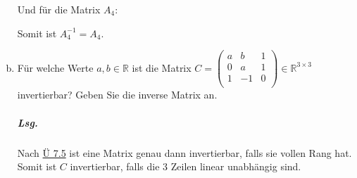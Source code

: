 \documentclass{scrreprt}
\begin{document}
\begin{enumerate}[(a)]
  Und für die Matrix $A_4$:
  Somit ist $A_4^{-1} = A_4$.

\newpage
\item Für welche Werte $a, b \in \mathbb{R}$ ist die Matrix $C = \begin{pmatrix}
  a & b  & 1 \\
  0 & a  & 1 \\
  1 & -1 & 0 \\
\end{pmatrix} \in \mathbb{R}^{3 \times 3}$ invertierbar?
Geben Sie die inverse Matrix an.

\subparagraph{Lsg.} Nach \hyperref[7_5]{Ü 7.5} ist eine Matrix genau dann
invertierbar, falls sie vollen Rang hat.
Somit ist $C$ invertierbar, falls die 3 Zeilen linear unabhängig sind.


\end{enumerate}
\end{document}
